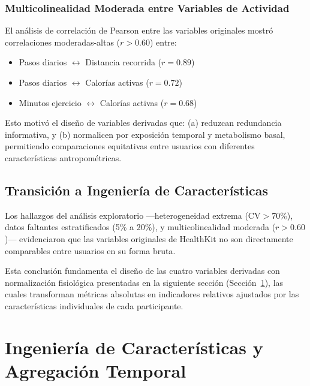 \subsubsection{Multicolinealidad Moderada entre Variables de Actividad}

El análisis de correlación de Pearson entre las variables originales mostró correlaciones moderadas-altas ($r>0.60$) entre:
\begin{itemize}
    \item Pasos diarios $\leftrightarrow$ Distancia recorrida ($r=0.89$)
    \item Pasos diarios $\leftrightarrow$ Calorías activas ($r=0.72$)
    \item Minutos ejercicio $\leftrightarrow$ Calorías activas ($r=0.68$)
\end{itemize}

Esto motivó el diseño de variables derivadas que: (a) reduzcan redundancia informativa, y (b) normalicen por exposición temporal y metabolismo basal, permitiendo comparaciones equitativas entre usuarios con diferentes características antropométricas.

\subsection{Transición a Ingeniería de Características}
\label{subsec:transicion_feature_engineering}

Los hallazgos del análisis exploratorio —heterogeneidad extrema (CV$>$70\%), datos faltantes estratificados (5\% a 20\%), y multicolinealidad moderada ($r>0.60$)— evidenciaron que las variables originales de HealthKit no son directamente comparables entre usuarios en su forma bruta.

Esta conclusión fundamenta el diseño de las cuatro variables derivadas con normalización fisiológica presentadas en la siguiente sección (Sección~\ref{sec:feature_engineering}), las cuales transforman métricas absolutas en indicadores relativos ajustados por las características individuales de cada participante.

\section{Ingeniería de Características y Agregación Temporal}
\label{sec:feature_engineering}


